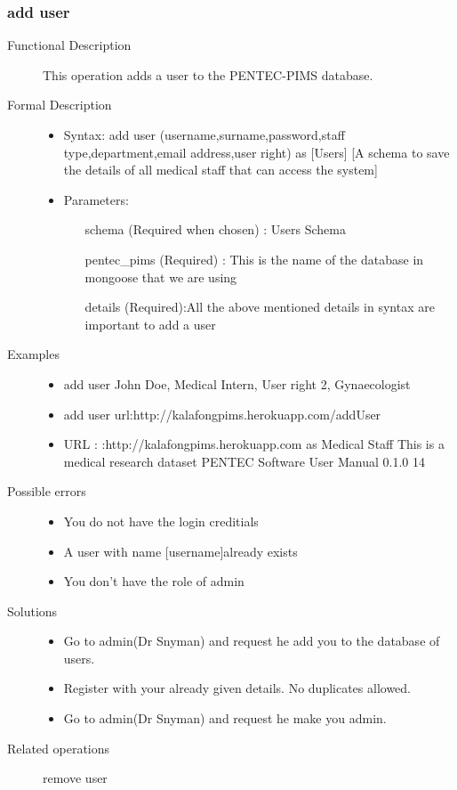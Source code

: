 \documentclass[14pt, a4paper]{article}
\begin{document}
\subsubsection{add user}
\begin{description}
\item [Functional Description] This operation adds a user to the PENTEC-PIMS database.
\item [Formal Description] \hfill
\begin{itemize}
	\item Syntax: add user (username,surname,password,staff type,department,email address,user right) as [Users] [A schema to save the details of all medical staff that can access the system]\\
	\item Parameters:
		\begin{itemize}
			\item [schema] (Required when chosen) : Users Schema\\
			\item [pentec\_pims] (Required) : This is the name of the database in mongoose that we are using\\
			\item [details](Required):All the above mentioned details in syntax are important to add a user\\
		 \end{itemize}
\end{itemize}
\item[Examples]\hfill
\begin{itemize}
	\item add user John Doe, Medical Intern, User right 2, Gynaecologist
	\item add user url:http://kalafongpims.herokuapp.com/addUser
	\item URL : :http://kalafongpims.herokuapp.com as Medical Staff This is a medical research dataset PENTEC Software User Manual 0.1.0 14
\end{itemize}
\item[Possible errors]\hfill
	\begin{itemize}
	\item You do not have the login creditials
	\item A user with name [username]already exists
	\item You don't have the role of admin
	\end{itemize}
\item[Solutions]\hfill
	\begin{itemize}
	\item Go to admin(Dr Snyman) and request he add you to the database of users.
	\item Register with your already given details. No duplicates allowed.
	\item  Go to admin(Dr Snyman) and request he make you admin.
	\end{itemize}
\item[Related operations] remove user
\end{description}
	  
\end{document}
